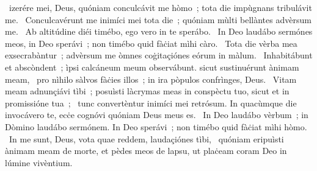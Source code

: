 { }
{%
~izerére mei, Deus, quóniam conculcávit me hòmo~; tota die impùgnans tribulávit me. 
~Conculcavérunt me inimíci mei tota die~; quóniam mùlti bellàntes advèrsum me. 
~Ab altitúdine diéi timébo, ego vero in te sperábo. 
~In Deo laudábo sermónes meos, in Deo sperávi~; non timébo quid fàċiat mìhi càro. 
~Tota die vèrba mea exsecrabàntur~; advèrsum me òmnes coġitaçiónes eórum in màlum. 
~Inhabitábunt et abscòndent~; ìpsi calcáneum meum observábunt. sicut sustinuérunt ànimam meam, 
~pro nìhilo sàlvos fàċies illos~; in ira pòpulos confrìnges, Deus. 
~Vitam meam adnunçiávi tìbi~; posuìsti làcrymas meas in conspèctu tuo, sicut et in promissióne tua~; 
~tunc convertèntur inimíci mei retrósum. In quacùmque die invocávero te, ecċe cognóvi quóniam Deus meus es. 
~In Deo laudábo vèrbum~; in Dòmino laudábo sermónem. In Deo sperávi~; non timébo quid fàċiat mìhi hòmo. 
~In me sunt, Deus, vota quae reddem, laudaçiónes tìbi, 
~quóniam eripuìsti ànimam meam de morte, et pèdes meos de lapsu, ut plaċeam coram Deo in lúmine vivèntium. 
}
